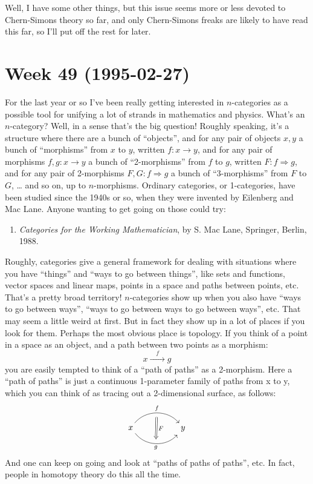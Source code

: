 \documentclass{article}
\def\tightlist{}
\begin{document}
Well, I have some other things, but this issue seems more or less
devoted to Chern-Simons theory so far, and only Chern-Simons freaks are
likely to have read this far, so I'll put off the rest for later.
\hypertarget{week49}{%
\section{Week 49 (1995-02-27)}\label{week49}}

For the last year or so I've been really getting interested in
\(n\)-categories as a possible tool for unifying a lot of strands in
mathematics and physics. What's an \(n\)-category? Well, in a sense
that's the big question! Roughly speaking, it's a structure where there
are a bunch of ``objects'', and for any pair of objects \(x,y\) a bunch
of ``morphisms'' from \(x\) to \(y\), written \(f\colon x \to y\), and
for any pair of morphisms \(f, g\colon x \to y\) a bunch of
``2-morphisms'' from \(f\) to \(g\), written
\(F\colon f \Rightarrow g\), and for any pair of 2-morphisms
\(F, G\colon f \Rightarrow g\) a bunch of ``3-morphisms'' from \(F\) to
\(G\), \ldots{} and so on, up to \(n\)-morphisms. Ordinary categories,
or 1-categories, have been studied since the 1940s or so, when they were
invented by Eilenberg and Mac Lane. Anyone wanting to get going on those
could try:

\begin{enumerate}
\def\labelenumi{\arabic{enumi})}
\tightlist
\item
  \emph{Categories for the Working Mathematician}, by S. Mac Lane,
  Springer, Berlin, 1988.
\end{enumerate}

Roughly, categories give a general framework for dealing with situations
where you have ``things'' and ``ways to go between things'', like sets
and functions, vector spaces and linear maps, points in a space and
paths between points, etc. That's a pretty broad territory!
\(n\)-categories show up when you also have ``ways to go between ways'',
``ways to go between ways to go between ways'', etc. That may seem a
little weird at first. But in fact they show up in a lot of places if
you look for them. Perhaps the most obvious place is topology. If you
think of a point in a space as an object, and a path between two points
as a morphism: \[x\xrightarrow{\quad f\quad}g\] you are easily tempted
to think of a ``path of paths'' as a 2-morphism. Here a ``path of
paths'' is just a continuous 1-parameter family of paths from x to y,
which you can think of as tracing out a 2-dimensional surface, as
follows: \[
  \begin{tikzcd}[sep=huge]
    x
      \rar[bend left=50,"f"{name=U}]
      \rar[bend right=50,swap,"g"{name=D}]
    & y
      \arrow[Rightarrow,shorten=5pt,from=U,to=D,"F"]
  \end{tikzcd}
\] And one can keep on going and look at ``paths of paths of paths'',
etc. In fact, people in homotopy theory do this all the time.
\end{document}
